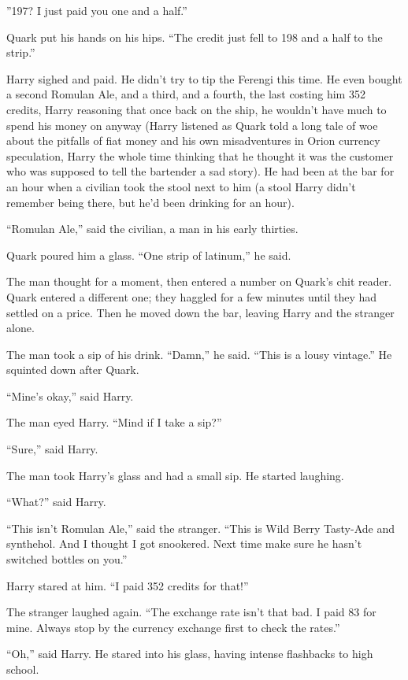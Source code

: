 \documentclass[twoside,letterpaper,12pt]{memoir}
\begin{document}
''197? I just paid you one and a half.''

Quark put his hands on his hips. ``The credit just fell to 198 and a half to the strip.''

Harry sighed and paid. He didn't try to tip the Ferengi this time. He even bought a second Romulan Ale, and a third, and a fourth, the last costing him 352 credits, Harry reasoning that once back on the ship, he wouldn't have much to spend his money on anyway (Harry listened as Quark told a long tale of woe about the pitfalls of fiat money and his own misadventures in Orion currency speculation, Harry the whole time thinking that he thought it was the customer who was supposed to tell the bartender a sad story). He had been at the bar for an hour when a civilian took the stool next to him (a stool Harry didn't remember being there, but he'd been drinking for an hour).

``Romulan Ale,'' said the civilian, a man in his early thirties.

Quark poured him a glass. ``One strip of latinum,'' he said.

The man thought for a moment, then entered a number on Quark's chit reader. Quark entered a different one; they haggled for a few minutes until they had settled on a price. Then he moved down the bar, leaving Harry and the stranger alone.

The man took a sip of his drink. ``Damn,'' he said. ``This is a lousy vintage.'' He squinted down after Quark.

``Mine's okay,'' said Harry.

The man eyed Harry. ``Mind if I take a sip?''

``Sure,'' said Harry.

The man took Harry's glass and had a small sip. He started laughing.

``What?'' said Harry.

``This isn't Romulan Ale,'' said the stranger. ``This is Wild Berry Tasty-Ade and synthehol. And I thought I got snookered. Next time make sure he hasn't switched bottles on you.''

Harry stared at him. ``I paid 352 credits for that!''

The stranger laughed again. ``The exchange rate isn't that bad. I paid 83 for mine. Always stop by the currency exchange first to check the rates.''

``Oh,'' said Harry. He stared into his glass, having intense flashbacks to high school.
\end{document}
